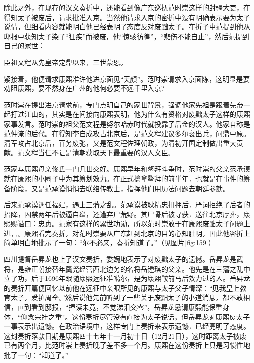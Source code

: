 
除此之外，在现存的汉文奏折中，还能看到像广东巡抚范时崇这样的封疆大吏，在得知太子被废后，请求批准入京。当然他请求入京的密折中没有明确表示要为太子说情，但细看内容就能明白他已经表明了态度反对废黜太子。在折子中范提到他从邸报中获知太子染了“狂疾”而被废，他“惊骇彷徨”，“悲伤不能自止”，然后范提到自己的家世：



\begin{bookquote}臣祖文程从先皇帝定鼎以来，三世蒙恩。\end{bookquote}


紧接着，他便请求康熙准许他进京面见“天颜”。范时崇请求入京面陈，这明显是要劝阻康熙，要不然身在广州的他何必要不远千里入京?



范时崇在提出进京请求前，专门点明自己的家世背景，强调他家先祖是跟着先帝一起打过江山的，其实是在间接向康熙表明，他为什么有资格对废黜太子这样的康熙家事发言。范时崇的祖父范文程是努尔哈赤时代就投靠了后金的汉人。他家自称是范仲淹的后代。在得知李自成攻占北京后，是范文程建议多尔衮出兵，问鼎中原。清军攻占北京后，百务废弛，又是范文程佐理朝政，为清初开国定制做出重大贡献。范文程当仁不让是清朝获取天下最重要的汉人文臣。



范家与康熙母亲佟氏一门几世交好。康熙早年和鳌拜斗争时，范时崇的父亲范承谟就在康熙的小圈子中为其筹划效力。在正式擒拿鳌拜的前半年，也就是在事件的筹备阶段，又是范承谟悄悄去联络传教士，指挥他们用历法问题去朝廷参劾。



后来范承谟调任福建，遇上三藩之乱。范承谟被耿精忠扣押后，严词拒绝了后者的招降，囚禁两年后被逼自缢，还遭弃尸荒野。其尸骨后被寻获，送往北京厚葬，康熙赐谥曰：忠贞。范家有这样的累世功勋，所以范时崇敢于在康熙废黜太子问题上进言。康熙看完奏折，对范时崇要从广东赶到北京的目的心知肚明，因此他密折上简单明白地批示了一句：“尔不必来，奏折知道了。”（见图片\ref{fig:159}）



四川提督岳昇龙也上了汉文奏折，委婉地表示了对废黜太子的遗憾。岳昇龙是武将，是雍正朝接替年羹尧经营西北边务的名将岳锺琪的父亲。他先是在三藩之乱中立了功，后于1696年跟随康熙远征准噶尔，是为康熙鞍前马后效力过的人。岳昇龙的奏折开篇便回忆以前他在远征中亲眼所见的康熙与太子父子情深：“见我皇上教育太子，爱护周全。”然后说他先前听到了一些关于废黜太子的小道消息，都不敢相信，直到看到邸报，“捧读未竟，不觉涕泪交零”。岳昇龙恳请康熙能保重身体，“仰念宗社之重”。这份奏折尽管没有直接为太子说话，但岳昇龙对康熙废太子一事表示出遗憾。在政治语境中，这样专门上奏折来表示遗憾，已经亮明了态度。这封奏折落款日期是康熙四十七年十一月初十日（12月21日），这时距离太子被废已有两个月，比范时崇上奏折晚了差不多一个月。康熙在这份奏折上只是习惯性地批了一句：“知道了。”

